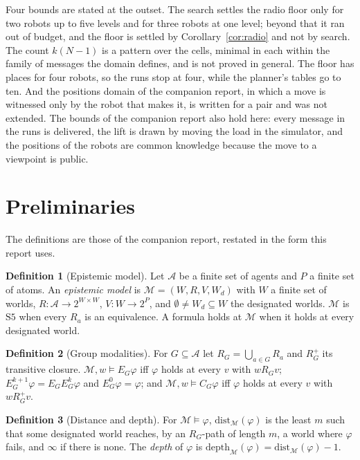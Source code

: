 \documentclass[11pt,a4paper]{article}
\theoremstyle{definition}
\newtheorem{definition}{Definition}
\newcommand{\Ag}{\mathcal{A}}
\newcommand{\Mod}{\mathcal{M}}
\newcommand{\Eop}[1]{E_{#1}}
\newcommand{\Cop}[1]{C_{#1}}
\newcommand{\dist}{\mathrm{dist}}
\newcommand{\depth}{\mathrm{depth}}
\begin{document}
Four bounds are stated at the outset. The search settles the radio floor only
for two robots up to five levels and for three robots at one level; beyond
that it ran out of budget, and the floor is settled by
Corollary~\ref{cor:radio} and not by search. The count $k(N-1)$ is a pattern
over the cells, minimal in each within the family of messages the domain
defines, and is not proved in general. The floor has places for four robots,
so the runs stop at four, while the planner's tables go to ten. And the
positions domain of the companion report, in which a move is witnessed only by
the robot that makes it, is written for a pair and was not extended. The
bounds of the companion report also hold here: every message in the runs is
delivered, the lift is drawn by moving the load in the simulator, and the
positions of the robots are common knowledge because the move to a viewpoint is
public.

\section{Preliminaries}
\label{sec:prelim}

The definitions are those of the companion report, restated in the form this
report uses.

\begin{definition}[Epistemic model]
Let $\Ag$ be a finite set of agents and $P$ a finite set of atoms. An
\emph{epistemic model} is $\Mod = (W, R, V, W_d)$ with $W$ a finite set of
worlds, $R : \Ag \to 2^{W\times W}$, $V : W \to 2^P$, and
$\emptyset \neq W_d \subseteq W$ the designated worlds. $\Mod$ is
$\mathrm{S5}$ when every $R_a$ is an equivalence. A formula holds at $\Mod$ when
it holds at every designated world.
\end{definition}

\begin{definition}[Group modalities]
For $G \subseteq \Ag$ let $R_G = \bigcup_{a\in G} R_a$ and $R_G^+$ its
transitive closure. $\Mod, w \models \Eop{G}\varphi$ iff $\varphi$ holds at
every $v$ with $w R_G v$; $\Eop{G}^{k+1}\varphi = \Eop{G}\Eop{G}^{k}\varphi$
and $\Eop{G}^0\varphi = \varphi$; and $\Mod, w \models \Cop{G}\varphi$ iff
$\varphi$ holds at every $v$ with $w R_G^+ v$.
\end{definition}

\begin{definition}[Distance and depth]
\label{def:depth}
For $\Mod \models \varphi$, $\dist_\Mod(\varphi)$ is the least $m$ such that
some designated world reaches, by an $R_G$-path of length $m$, a world where
$\varphi$ fails, and $\infty$ if there is none. The \emph{depth} of $\varphi$
is $\depth_\Mod(\varphi) = \dist_\Mod(\varphi) - 1$.
\end{definition}
\end{document}
